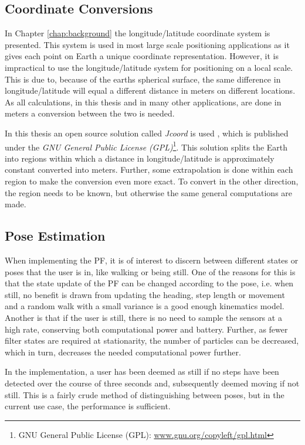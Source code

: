 \documentclass{LTHthesis}
\begin{document}
%
\subsection{Coordinate Conversions}
In Chapter \ref{chap:background} the longitude/latitude coordinate system is presented. This system is used in most large scale positioning applications as it gives each point on Earth a unique coordinate representation. However, it is impractical to use the longitude/latitude system for positioning on a local scale. This is due to, because of the earths spherical surface, the same difference in longitude/latitude will equal a different distance in meters on different locations. As all calculations, in this thesis and in many other applications, are done in meters a conversion between the two is needed. 

In this thesis an open source solution called \emph{Jcoord} is used \cite{jcoord}, which is published under the \emph{GNU General Public License (GPL)}\footnote{GNU General Public License (GPL): \url{www.gnu.org/copyleft/gpl.html}}. This solution splits the Earth into regions within which a distance in longitude/latitude is approximately constant converted into meters. Further, some extrapolation is done within each region to make the conversion even more exact. To convert in the other direction, the region needs to be known, but otherwise the same general computations are made.   
%
\subsection{Pose Estimation}
%
When implementing the PF, it is of interest to discern between different states or poses that the user is in, like walking or being still. One of the reasons for this is that the state update of the PF can be changed according to the pose, i.e. when still, no benefit is drawn from updating the heading, step length or movement and a random walk with a small variance is a good enough kinematics model. Another is that if the user is still, there is no need to sample the sensors at a high rate, conserving both computational power and battery. Further, as fewer filter states are required at stationarity, the number of particles can be decreased, which in turn, decreases the needed computational power further. 

In the implementation, a user has been deemed as still if no steps have been detected over the course of three seconds and, subsequently deemed moving if not still. This is a fairly crude method of distinguishing between poses, but in the current use case, the performance is sufficient.  
%
\end{document}
